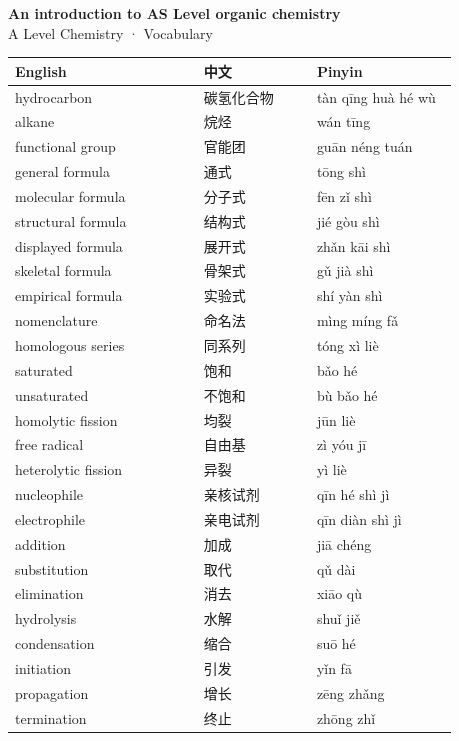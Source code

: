 \documentclass[11pt]{article}
\begin{document}
\begin{center}
  {\LARGE\bfseries An introduction to AS Level organic chemistry}\\[0.35em]
  {\large A Level Chemistry · Vocabulary}
\end{center}
\vspace{0.6em}

\begin{longtable}{@{}p{0.40\linewidth}p{0.24\linewidth}p{0.30\linewidth}@{}}
\toprule
\textbf{English} & \textbf{中文} & \textbf{Pinyin} \\
\midrule
\endhead
\bottomrule
\endlastfoot
hydrocarbon & 碳氢化合物 & tàn qīng huà hé wù \\
alkane & 烷烃 & wán tīng \\
functional group & 官能团 & guān néng tuán \\
general formula & 通式 & tōng shì \\
molecular formula & 分子式 & fēn zǐ shì \\
structural formula & 结构式 & jié gòu shì \\
displayed formula & 展开式 & zhǎn kāi shì \\
skeletal formula & 骨架式 & gǔ jià shì \\
empirical formula & 实验式 & shí yàn shì \\
nomenclature & 命名法 & mìng míng fǎ \\
homologous series & 同系列 & tóng xì liè \\
saturated & 饱和 & bǎo hé \\
unsaturated & 不饱和 & bù bǎo hé \\
homolytic fission & 均裂 & jūn liè \\
free radical & 自由基 & zì yóu jī \\
heterolytic fission & 异裂 & yì liè \\
nucleophile & 亲核试剂 & qīn hé shì jì \\
electrophile & 亲电试剂 & qīn diàn shì jì \\
addition & 加成 & jiā chéng \\
substitution & 取代 & qǔ dài \\
elimination & 消去 & xiāo qù \\
hydrolysis & 水解 & shuǐ jiě \\
condensation & 缩合 & suō hé \\
initiation & 引发 & yǐn fā \\
propagation & 增长 & zēng zhǎng \\
termination & 终止 & zhōng zhǐ \\

\end{longtable}
\end{document}
